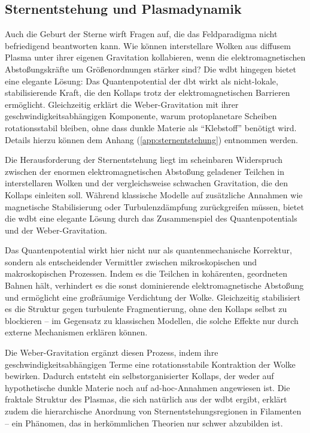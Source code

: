 \subsection{Sternentstehung und Plasmadynamik}
Auch die Geburt der Sterne wirft Fragen auf, die das Feldparadigma nicht befriedigend beantworten kann. Wie können interstellare Wolken aus diffusem Plasma unter ihrer eigenen
Gravitation kollabieren, wenn die elektromagnetischen Abstoßungskräfte um Größenordnungen stärker sind? Die \gls{wdbt} hingegen bietet eine elegante Lösung: Das Quantenpotential der \gls{dbt}
wirkt als nicht-lokale, stabilisierende Kraft, die den Kollaps trotz der elektromagnetischen Barrieren ermöglicht. Gleichzeitig erklärt die Weber-Gravitation mit ihrer geschwindigkeitsabhängigen
Komponente, warum protoplanetare Scheiben rotationsstabil bleiben, ohne dass dunkle Materie als \enquote{Klebstoff} benötigt wird. Details hierzu können dem Anhang (\ref{app:sternentstehung})
entnommen werden.

Die Herausforderung der Sternentstehung liegt im scheinbaren Widerspruch zwischen der enormen elektromagnetischen Abstoßung geladener Teilchen in interstellaren Wolken und der
vergleichsweise schwachen Gravitation, die den Kollaps einleiten soll. Während klassische Modelle auf zusätzliche Annahmen wie magnetische Stabilisierung oder Turbulenzdämpfung
zurückgreifen müssen, bietet die \gls{wdbt} eine elegante Lösung durch das Zusammenspiel des Quantenpotentials und der Weber-Gravitation.

Das Quantenpotential wirkt hier nicht nur als quantenmechanische Korrektur, sondern als entscheidender Vermittler zwischen mikroskopischen und makroskopischen Prozessen. Indem es
die Teilchen in kohärenten, geordneten Bahnen hält, verhindert es die sonst dominierende elektromagnetische Abstoßung und ermöglicht eine großräumige Verdichtung der Wolke.
Gleichzeitig stabilisiert es die Struktur gegen turbulente Fragmentierung, ohne den Kollaps selbst zu blockieren – im Gegensatz zu klassischen Modellen, die solche Effekte nur
durch externe Mechanismen erklären können.

Die Weber-Gravitation ergänzt diesen Prozess, indem ihre geschwindigkeitsabhängigen Terme eine rotationsstabile Kontraktion der Wolke bewirken. Dadurch entsteht ein
selbstorganisierter Kollaps, der weder auf hypothetische dunkle Materie noch auf ad-hoc-Annahmen angewiesen ist. Die fraktale Struktur des Plasmas, die sich natürlich aus der
\gls{wdbt} ergibt, erklärt zudem die hierarchische Anordnung von Sternentstehungsregionen in Filamenten – ein Phänomen, das in herkömmlichen Theorien nur schwer abzubilden ist.

